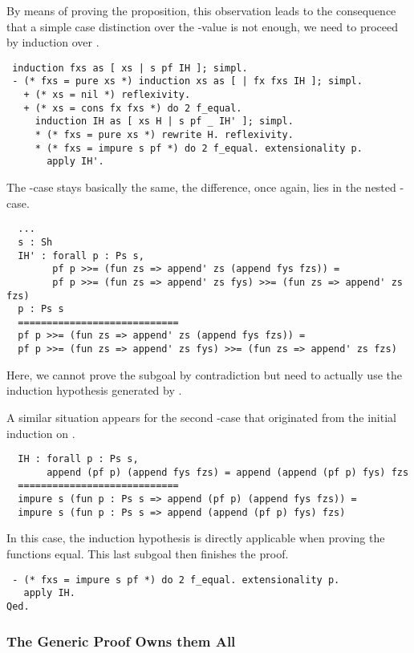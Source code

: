 By means of proving the proposition, this observation leads to the
consequence that a simple case distinction over the -value
 is not enough, we need to proceed by induction over
.

\begin{verbatim}
 induction fxs as [ xs | s pf IH ]; simpl.
 - (* fxs = pure xs *) induction xs as [ | fx fxs IH ]; simpl.
   + (* xs = nil *) reflexivity.
   + (* xs = cons fx fxs *) do 2 f_equal.
     induction IH as [ xs H | s pf _ IH' ]; simpl.
     * (* fxs = pure xs *) rewrite H. reflexivity.
     * (* fxs = impure s pf *) do 2 f_equal. extensionality p.
       apply IH'.
\end{verbatim}

The -case stays basically the same, the difference, once
again, lies in the nested -case.

\begin{verbatim}
  ...
  s : Sh
  IH' : forall p : Ps s,
        pf p >>= (fun zs => append' zs (append fys fzs)) =
        pf p >>= (fun zs => append' zs fys) >>= (fun zs => append' zs fzs)
  p : Ps s
  ============================
  pf p >>= (fun zs => append' zs (append fys fzs)) =
  pf p >>= (fun zs => append' zs fys) >>= (fun zs => append' zs fzs)
\end{verbatim}

Here, we cannot prove the subgoal by contradiction but need to
actually use the induction hypothesis  generated by
.

A similar situation appears for the second -case that
originated from the initial induction on .
\begin{verbatim}
  IH : forall p : Ps s,
       append (pf p) (append fys fzs) = append (append (pf p) fys) fzs
  ============================
  impure s (fun p : Ps s => append (pf p) (append fys fzs)) =
  impure s (fun p : Ps s => append (append (pf p) fys) fzs)
\end{verbatim}

In this case, the induction hypothesis is directly applicable when
proving the functions equal.
This last subgoal then finishes the proof.

\begin{verbatim}
 - (* fxs = impure s pf *) do 2 f_equal. extensionality p.
   apply IH.
Qed.
\end{verbatim}

\subsubsection{The Generic Proof Owns them All}


